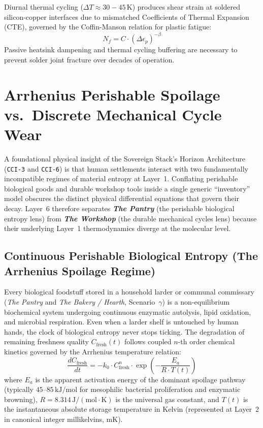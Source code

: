 Diurnal thermal cycling ($\Delta T \approx 30-45\,\mathrm{K}$) produces shear strain at soldered silicon-copper interfaces due to mismatched Coefficients of Thermal Expansion (CTE), governed by the Coffin-Manson relation for plastic fatigue:
\begin{equation}
N_f = C \cdot (\Delta \epsilon_p)^{-\beta}
\label{eq:coffin_manson}
\end{equation}
Passive heatsink dampening and thermal cycling buffering are necessary to prevent solder joint fracture over decades of operation.

\section{Arrhenius Perishable Spoilage vs.\ Discrete Mechanical Cycle Wear}
\label{sec:l1_perishable_vs_durable}

A foundational physical insight of the Sovereign Stack's Horizon Architecture (\texttt{CCI-3} and \texttt{CCI-6}) is that human settlements interact with two fundamentally incompatible regimes of material entropy at Layer~1. Conflating perishable biological goods and durable workshop tools inside a single generic ``inventory'' model obscures the distinct physical differential equations that govern their decay. Layer~6 therefore separates \textbf{\textit{The Pantry}} (the perishable biological entropy lens) from \textbf{\textit{The Workshop}} (the durable mechanical cycles lens) because their underlying Layer~1 thermodynamics diverge at the molecular level.

\subsection{Continuous Perishable Biological Entropy (The Arrhenius Spoilage Regime)}

Every biological foodstuff stored in a household larder or communal commissary (\textit{The Pantry} and \textit{The Bakery / Hearth}, Scenario~$\gamma$) is a non-equilibrium biochemical system undergoing continuous enzymatic autolysis, lipid oxidation, and microbial respiration. Even when a larder shelf is untouched by human hands, the clock of biological entropy never stops ticking. The degradation of remaining freshness quality $C_{\mathrm{fresh}}(t)$ follows coupled $n$-th order chemical kinetics governed by the Arrhenius temperature relation:
\begin{equation}
\frac{d C_{\mathrm{fresh}}}{dt} = - k_0 \cdot C_{\mathrm{fresh}}^n \cdot \exp\left( - \frac{E_a}{R \cdot T(t)} \right)
\label{eq:l1_arrhenius_spoilage}
\end{equation}
where $E_a$ is the apparent activation energy of the dominant spoilage pathway (typically $45\text{--}85\,\mathrm{kJ/mol}$ for mesophilic bacterial proliferation and enzymatic browning), $R = 8.314\,\mathrm{J/(mol\cdot K)}$ is the universal gas constant, and $T(t)$ is the instantaneous absolute storage temperature in Kelvin (represented at Layer~2 in canonical integer millikelvins, $\mathrm{mK}$).

